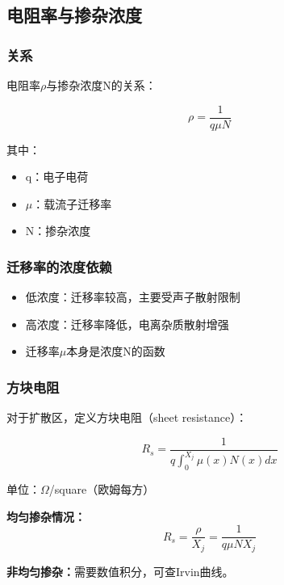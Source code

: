 \documentclass[UTF8,12pt,a4paper]{ctexart}
\begin{document}
\subsection{电阻率与掺杂浓度}

\subsubsection{关系}

电阻率$\rho$与掺杂浓度N的关系：

\begin{equation}
\rho = \frac{1}{q \mu N}
\end{equation}

其中：
\begin{itemize}
    \item q：电子电荷
    \item $\mu$：载流子迁移率
    \item N：掺杂浓度
\end{itemize}

\subsubsection{迁移率的浓度依赖}

\begin{itemize}
    \item 低浓度：迁移率较高，主要受声子散射限制
    \item 高浓度：迁移率降低，电离杂质散射增强
    \item 迁移率$\mu$本身是浓度N的函数
\end{itemize}

\subsubsection{方块电阻}

对于扩散区，定义方块电阻（sheet resistance）：

\begin{equation}
R_s = \frac{1}{q \int_0^{X_j} \mu(x) N(x) dx}
\end{equation}

单位：$\Omega$/square（欧姆每方）

\textbf{均匀掺杂情况：}
\begin{equation}
R_s = \frac{\rho}{X_j} = \frac{1}{q \mu N X_j}
\end{equation}

\textbf{非均匀掺杂：}需要数值积分，可查Irvin曲线。
\end{document}

